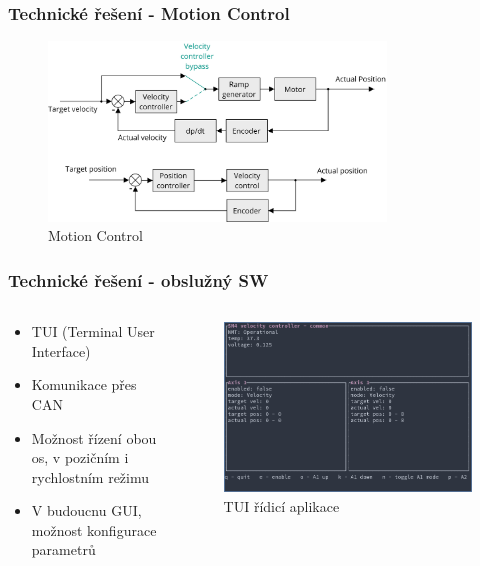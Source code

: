\documentclass[%
  12pt,       				%
	t,                  %
	aspectratio=1610,   %
	unicode,						%
]{beamer}				    	%
\begin{document}
\begin{frame}
	\frametitle{Technické řešení - Motion Control}
	\begin{figure}%
		\centering
		\includegraphics[width=0.8\textwidth]{../Thesis/obrazky/motion_control}
		\caption{Motion Control}%
		\label{fig:sm4_block}
	\end{figure}
\end{frame}
\begin{frame}
	\frametitle{Technické řešení - obslužný SW}
	\begin{columns}[T] 								%
		\begin{column}{0.4\textwidth}
			\begin{itemize}
				\item TUI (Terminal User Interface)
				\item Komunikace přes CAN
				\item Možnost řízení obou os, v pozičním i rychlostním režimu
				\item V budoucnu GUI, možnost konfigurace parametrů
			\end{itemize}
		\end{column}
		\begin{column}{0.6\textwidth}		%
			\begin{figure}%
				\centering
				\includegraphics[width=0.8\columnwidth]{../Thesis/obrazky/tui}
				\caption{TUI řídicí aplikace}%
				\label{fig:sm4_block}
			\end{figure}
		\end{column}
	\end{columns}
\end{frame}
\end{document}
